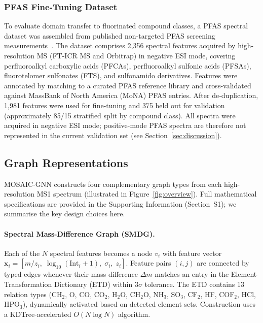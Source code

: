 \documentclass[journal=jcisd8]{achemso}
\newcommand{\vect}[1]{\boldsymbol{#1}}
\begin{document}
\FloatBarrier
\subsubsection{PFAS Fine-Tuning Dataset}

To evaluate domain transfer to fluorinated compound classes, a PFAS spectral dataset was
assembled from published non-targeted PFAS screening measurements~\cite{Aron2020}.
The dataset comprises 2{,}356 spectral features acquired by high-resolution MS (FT-ICR MS
and Orbitrap) in negative ESI mode, covering perfluoroalkyl carboxylic acids (PFCAs),
perfluoroalkyl sulfonic acids (PFSAs), fluorotelomer sulfonates (FTS), and sulfonamido
derivatives.  Features were annotated by matching to a curated PFAS reference library and
cross-validated against MassBank of North America (MoNA) PFAS entries.
After de-duplication, 1{,}981 features were used for fine-tuning and 375 held out for
validation (approximately 85/15 stratified split by compound class).
All spectra were acquired in negative ESI mode; positive-mode PFAS spectra are therefore
not represented in the current validation set (see Section~\ref{sec:discussion}).

\subsection{Graph Representations}
\label{sec:graphs}

MOSAIC-GNN constructs four complementary graph types from each high-resolution MS1 spectrum
(illustrated in Figure~\ref{fig:overview}).
Full mathematical specifications are provided in the Supporting Information
(Section~S1); we summarise the key design choices here.

\paragraph{Spectral Mass-Difference Graph (SMDG).}
Each of the $N$ spectral features becomes a node $v_i$ with feature vector
$\vect{x}_i = [m/z_i,\; \log_{10}(\text{Int}_i+1),\; \sigma_i,\; z_i]$.
Feature pairs $(i,j)$ are connected by typed edges whenever their mass difference
$\Delta m$ matches an entry in the Element-Transformation Dictionary (ETD) within
$3\sigma$ tolerance.  The ETD contains 13 relation types (CH$_2$, O, CO, CO$_2$,
H$_2$O, CH$_2$O, NH$_3$, SO$_3$, CF$_2$, HF, COF$_2$, HCl, HPO$_3$),
dynamically activated based on detected element sets.  Construction uses a
KDTree-accelerated $O(N\log N)$ algorithm.
\end{document}
